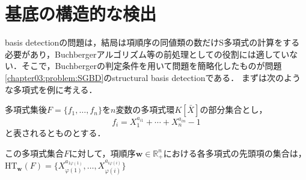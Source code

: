 \section{\groebner{}基底の構造的な検出}
\groebner{} basis detectionの問題は，結局は項順序の同値類の数だけS多項式の計算をする必要があり，Buchbergerアルゴリズム等の前処理としての役割には適していない．そこで，Buchbergerの判定条件を用いて問題を簡略化したものが問題\ref{chapter03:problem:SGBD}のstructural \groebner{} basis detectionである．
まずは次のような多項式を例に考える．
\begin{example}
	多項式集後$F = \{f_1, \dots, f_n\}$を$n$変数の多項式環$K[\bar{X}]$の部分集合とし，
	$$f_i = X_{1}^{a_{i1}} + \cdots + X_n^{a_{in}} - 1$$
	と表されるとものとする．
\end{example}
この多項式集合$F$に対して，項順序$\bm{w} \in \mathbb{R}_{+}^n$における各多項式の先頭項の集合は，$\mathrm{HT}_{\bm{w}}(F) = \{X_{\varphi(1)}^{a_{1\varphi(1)}}, \dots, X_{\varphi(i)}^{a_{i\varphi(i)}}\}$